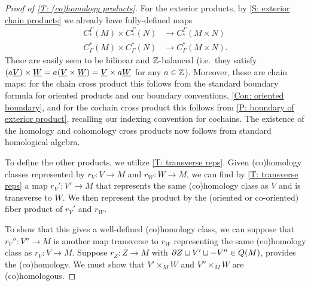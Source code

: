 \begin{proof}[Proof of \cref{T: (co)homology products}]
	For the exterior products, by \cref{S: exterior chain products} we already have fully-defined maps
	\begin{align*}C^\Gamma_*(M) \times C^\Gamma_*(N)& \to C^\Gamma_*(M \times N)\\ C_\Gamma^*(M) \times C_\Gamma^*(N)& \to C_\Gamma^*(M \times N).
	\end{align*}
	These are easily seen to be bilinear and $\mathbb{Z}$-balanced (i.e.\ they satisfy $(a\underline{V}) \times \underline{W} = a(\underline{V} \times \underline{W}) = \underline{V} \times a\underline{W}$ for any $a \in \mathbb{Z}$).
	Moreover, these are chain maps: for the chain cross product this follows from the standard boundary formula for oriented products and our boundary conventions, \cref{Con: oriented boundary}, and for the cochain cross product this follows from \cref{P: boundary of exterior product}, recalling our indexing convention for cochains.
	The existence of the homology and cohomology cross products now follows from standard homological algebra.



	\begin{comment}
	 show that if we are given homology or cohomology classes (depending on the particular product), then they can be represented by chains or cochains $\uV$ and $\uW$ that are simply transverse and that the product does not depend on such a choice.
	The general idea of the proof is relatively standard and analogous to the proof of \cref{T: transverse complex}.
	We provide the details here modulo a technical lemma that we will prove below.
	\end{comment}

	To define the other products, we utilize \cref{T: transverse reps}.
	Given (co)homology classes represented by $r_V \colon V \to M$ and $r_W \colon W \to M$, we can find by \cref{T: transverse reps} a map $r_V' \colon V' \to M$ that represents the same (co)homology class as $V$ and is transverse to $W$.
	We then represent the product by the (oriented or co-oriented) fiber product of $r_V'$ and $r_W$.

	To show that this gives a well-defined (co)homology class, we can suppose that $r_V'' \colon V'' \to M$ is another map transverse to $r_W$ representing the same (co)homology class as $r_V \colon V \to M$.
	Suppose $r_Z:Z \to M$ with $\partial Z \sqcup V' \sqcup -V'' \in Q(M)$, provides the (co)homology.
	We must show that $V' \times_M W$ and $V'' \times_M W$ are (co)homologous.


\end{proof}
